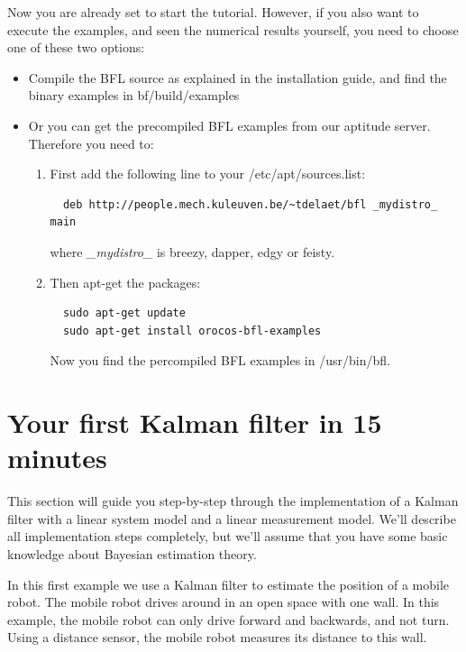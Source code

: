 \documentclass[a4paper,10pt]{report}
\begin{document}
Now you are already set to start the tutorial. However, if you also
want to execute the examples, and seen the numerical results yourself,
you need to choose one of these two options:
\begin{itemize}
\item Compile the BFL source as explained in the installation guide,
  and find the binary examples in bf/build/examples
\item Or you can get the precompiled BFL examples from our aptitude
  server. Therefore you need to:\
\begin{enumerate}
\item First add the following line to your /etc/apt/sources.list:
\begin{verbatim}
  deb http://people.mech.kuleuven.be/~tdelaet/bfl _mydistro_ main
\end{verbatim}
  where \emph{\_mydistro\_} is breezy, dapper, edgy or feisty.
\item Then apt-get the packages:
\begin{verbatim}
  sudo apt-get update
  sudo apt-get install orocos-bfl-examples
\end{verbatim}
Now you find the percompiled BFL examples in /usr/bin/bfl.
\end{enumerate}
\end{itemize}






\pagebreak
\section{Your first Kalman filter in 15 minutes}
This section will guide you step-by-step through the implementation of
a Kalman filter with a linear system model and a linear measurement
model. We'll describe all implementation steps completely, but we'll
assume that you have some basic knowledge about Bayesian estimation
theory.

In this first example we use a Kalman filter to estimate the position
of a mobile robot. The mobile robot drives around in an open space
with one wall. In this example, the mobile robot can only drive
forward and backwards, and not turn. Using a distance sensor, the
mobile robot measures its distance to this wall.
\end{document}
